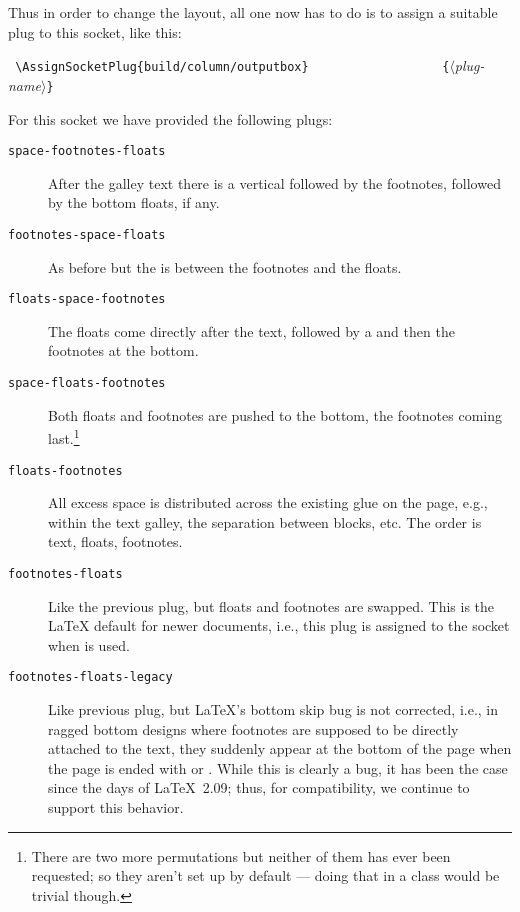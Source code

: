 \documentclass{ltnews}
\providecommand\plug[1]{\texttt{#1}}
\providecommand\meta[1]{$\langle$\textrm{\itshape#1}$\rangle$}
\begin{document}
Thus in order to change the layout, all one now has to do is to assign
a suitable plug to this socket, like this:
\begin{flushleft}
  \verb= \AssignSocketPlug{build/column/outputbox}=
  \verb=                  {=\meta{plug-name}\verb=}=
\end{flushleft}
%
For this socket we have provided the following plugs:
\begin{description}
\item[\plug{space-footnotes-floats}]

   After the galley text there is a vertical 
   followed by the footnotes, followed by the bottom floats, if any.

\item[\plug{footnotes-space-floats}]

   As before but the  is between the footnotes and the floats.

\item[\plug{floats-space-footnotes}]

   The floats come directly after the text, followed by a 
   and then the footnotes at the bottom.

\item[\plug{space-floats-footnotes}]

   Both floats and footnotes are pushed to the bottom, the footnotes
   coming last.\footnote{There are two more permutations but neither
   of them has ever been requested; so they aren't set up by default
   --- doing that in a class would be trivial though.}

\item[\plug{floats-footnotes}]

   All excess space is distributed across the existing glue on the
   page, e.g., within the text galley, the separation between blocks,
   etc.  The order is text, floats, footnotes.

\item[\plug{footnotes-floats}]

   Like the previous plug, but floats and footnotes are swapped. This is
   the \LaTeX{} default for newer documents, i.e., this plug is
   assigned to the socket when  is used.

\item[\plug{footnotes-floats-legacy}]

   Like previous plug, but \LaTeX{}'s bottom skip bug is not
   corrected, i.e., in ragged bottom designs where footnotes are
   supposed to be directly attached to the text, they suddenly appear
   at the bottom of the page when the page is ended with 
   or .  While this is clearly a bug, it has been the
   case since the days of \LaTeX~2.09; thus, for compatibility, we
   continue to support this behavior.
\end{description}
\end{document}
